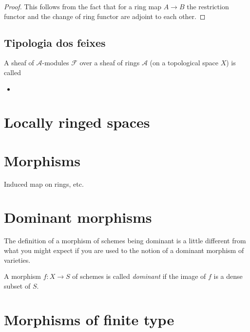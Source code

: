 \begin{proof}
This follows from the fact that for a ring map
$A \to B$ the restriction functor and the change
of ring functor are adjoint to each other.
\end{proof}

\subsection{Tipologia dos feixes}
\label{subsection-tipologia-dos-feixes}

\begin{definition}
\label{definition-tipologia-dos-feixes}
A sheaf of $\mathcal{A}$-modules $\mathcal{F}$ over a sheaf of rings 
$\mathcal{A}$ (on a topological space $X$) is called
\begin{itemize}
\item 
\end{itemize}
\end{definition}

\section{Locally ringed spaces}
\label{section-locally-ringed-spaces}

\section{Morphisms}
\label{section-morphisms}

Induced map on rings, etc.

\section{Dominant morphisms}
\label{section-dominant}

\noindent
The definition of a morphism of schemes being dominant is a little
different from what you might expect if you are used to the notion
of a dominant morphism of varieties.

\begin{definition}
\label{definition-dominant}
A morphism $f : X \to S$ of schemes is called {\it dominant} if the
image of $f$ is a dense subset of $S$.
\end{definition}

\section{Morphisms of finite type}
\label{section-finite-type}


